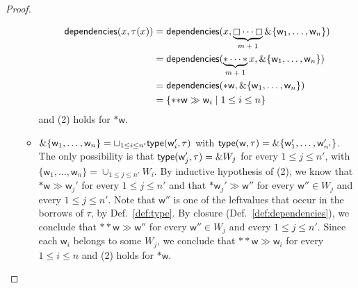 \begin{proof}
\begin{itemize}
\begin{itemize}
\begin{align*}
        \mathsf{dependencies}(x,\tau(x))&=\mathsf{dependencies}(x,\underbrace{\boxempty\cdots\boxempty}_{\text{$m+1$}}\&\{\mathsf{w}_1,\ldots,\mathsf{w}_n\})\\
        &=\mathsf{dependencies}(\underbrace{\mathtt{*}\cdots\mathtt{*}}_{\text{$m+1$}}x,
        \&\{\mathsf{w}_1,\ldots,\mathsf{w}_n\})\\
        &=\mathsf{dependencies}(\mathtt{*}\mathsf{w},\&\{\mathsf{w}_1,\ldots,\mathsf{w}_n\})\\
        &=\{\mathtt{**}\mathsf{w}\gg\mathsf{w}_i\mid 1\le i\le n\}
      \end{align*}
      and (2) holds for $\mathtt{*}\mathsf{w}$.
    \item $\&\{\mathsf{w}_1,\ldots,\mathsf{w}_n\}=\sqcup_{1\le i\le n'}\mathsf{type}(\mathsf{w}_i',\tau)$
      with $\mathsf{type}(\mathsf{w},\tau)=\&\{\mathsf{w}'_1,\ldots,\mathsf{w}'_{n'}\}$.
      The only possibility is that $\mathsf{type}(\mathsf{w}_j',\tau)=\& W_j$ for every $1\le j\le n'$,
      with $\{\mathsf{w}_1,\ldots,\mathsf{w}_n\}=\cup_{1\le j\le n'}W_i$.
      By inductive hypothesis of (2), we know that
      $\mathtt{*}\mathsf{w}\gg\mathsf{w}_j'$ for every $1\le j\le n'$ and that
      $\mathtt{*}\mathsf{w}_j'\gg\mathsf{w}''$ for every $\mathsf{w}''\in W_j$ and
      every $1\le j\le n'$. Note that $\mathsf{w}''$ is one of the leftvalues that occur
      in the borrows of $\tau$, by Def.~\ref{def:type}.
      By closure (Def.~\ref{def:dependencies}), we conclude that
      $\mathtt{**}\mathsf{w}\gg\mathsf{w}''$ for every $\mathsf{w}''\in W_j$ and
      every $1\le j\le n'$. Since each $\mathsf{w}_i$ belongs to some $W_j$, we conclude that
      $\mathtt{**}\mathsf{w}\gg\mathsf{w}_i$ for every $1\le i\le n$ and (2) holds for $\mathtt{*}\mathsf{w}$.
    \end{itemize}
  \end{itemize}
\end{proof}
